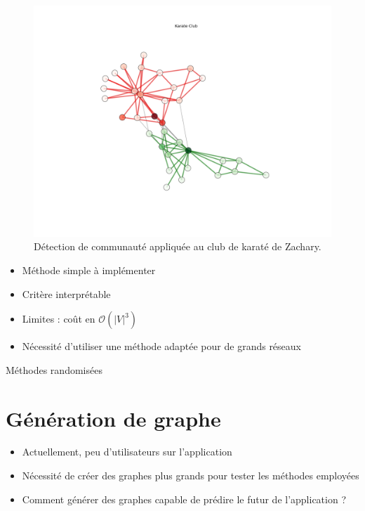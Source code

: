 \documentclass[c]{beamer}
\begin{document}
\begin{frame}
    \begin{figure}
        \includegraphics[width=.8\textwidth]{./karate_club_split.png}
        \caption{Détection de communauté appliquée au club de karaté de
        Zachary.}
    \end{figure}
\end{frame}

\begin{frame}
    \begin{itemize}
        \item Méthode simple à implémenter
        \item Critère interprétable
        \item Limites : coût en $\mathcal{O} (|V|^3)$
        \item Nécessité d'utiliser une méthode adaptée pour de grands réseaux
    \end{itemize}
\end{frame}

\begin{frame}
    Méthodes randomisées
\end{frame}

\section{Génération de graphe}

\begin{frame}
    \begin{itemize}
        \item Actuellement, peu d'utilisateurs sur l'application
        \item Nécessité de créer des graphes plus grands pour tester les
            méthodes employées
        \item Comment générer des graphes capable de \og prédire \fg{} le
            futur de l'application ?
    \end{itemize}
\end{frame}
\end{document}
